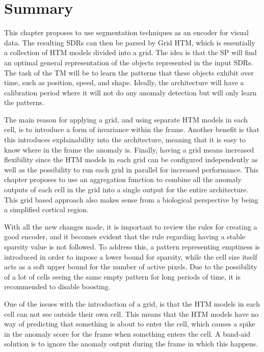 \section{Summary}
This chapter proposes to use segmentation techniques as an encoder for visual data. The resulting SDRs can then be parsed by Grid HTM, which is essentially a collection of HTM models divided into a grid. The idea is that the SP will find an optimal general representation of the objects represented in the input SDRs. The task of the TM will be to learn the patterns that these objects exhibit over time, such as position, speed, and shape. Ideally, the architecture will have a calibration period where it will not do any anomaly detection but will only learn the patterns.
\par
The main reason for applying a grid, and using separate HTM models in each cell, is to introduce a form of invariance within the frame. Another benefit is that this introduces explainability into the architecture, meaning that it is easy to know where in the frame the anomaly is. Finally, having a grid means increased flexibility since the HTM models in each grid can be configured independently as well as the possibility to run each grid in parallel for increased performance. This chapter proposes to use an aggregation function to combine all the anomaly outputs of each cell in the grid into a single output for the entire architecture. This grid based approach also makes sense from a biological perspective by being a simplified cortical region.
\par
With all the new changes made, it is important to review the rules for creating a good encoder, and it becomes evident that the rule regarding having a stable sparsity value is not followed. To address this, a pattern representing emptiness is introduced in order to impose a lower bound for sparsity, while the cell size itself acts as a soft upper bound for the number of active pixels. Due to the possibility of a lot of cells  seeing the same empty pattern for long periods of time, it is recommended to disable boosting.
\par
One of the issues with the introduction of a grid, is that the HTM models in each cell can not see outside their own cell. This means that the HTM models have no way of predicting that something is about to enter the cell, which causes a spike in the anomaly score for the frame when something enters the cell. A band-aid solution is to ignore the anomaly output during the frame in which this happens.
\par
